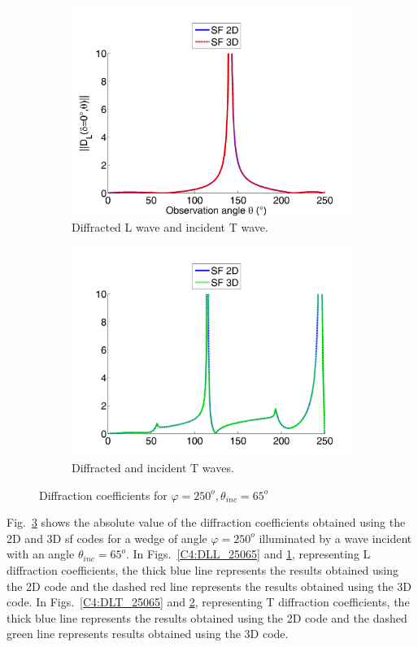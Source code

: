 \begin{figure}
\begin{subfigure}[b]{0.44\textwidth}
        \includegraphics[width=\textwidth]{images/chapter4/XpropL_250_65_0_TH.png}
        \caption{Diffracted L wave and incident T wave.}
        \label{C4:DTL_25065}
    \end{subfigure}
    \begin{subfigure}[b]{0.44\textwidth}
        \includegraphics[width=\textwidth]{images/chapter4/XpropTH_250_65_0_TH.png}
        \caption{Diffracted and incident T waves.}
        \label{C4:DTT_25065}
     \end{subfigure}
     \caption{Diffraction coefficients for $\varphi=250^o, \theta_{inc}=65^o$}
     \label{C4:25065}
\end{figure}

Fig.~\ref{C4:25065} shows the absolute value of the diffraction coefficients obtained using the 2D and 3D \acrshort{sf} codes for a wedge of angle $\varphi=250^o$ illuminated by a wave incident with an angle $\theta_{inc}=65^o$. In Figs.~\ref{C4:DLL_25065} and \ref{C4:DTL_25065}, representing L diffraction coefficients, the thick blue line represents the results obtained using the 2D code and the dashed red line represents the results obtained using the 3D code. In Figs.~\ref{C4:DLT_25065} and \ref{C4:DTT_25065}, representing T diffraction coefficients, the thick blue line represents the results obtained using the 2D code and the dashed green line represents results obtained using the 3D code.

